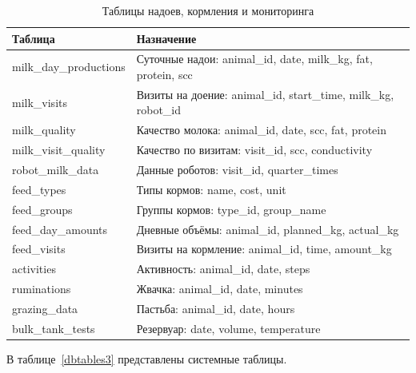 \begin{table}
  \caption{Таблицы надоев, кормления и мониторинга}
  \begin{tabular}{|l|p{8cm}|}
    \hline
    \textbf{Таблица} & \textbf{Назначение} \\
    \hline
    milk\_day\_productions & Суточные надои: animal\_id, date, milk\_kg, fat, protein, scc \\
    \hline
    milk\_visits & Визиты на доение: animal\_id, start\_time, milk\_kg, robot\_id \\
    \hline
    milk\_quality & Качество молока: animal\_id, date, scc, fat, protein \\
    \hline
    milk\_visit\_quality & Качество по визитам: visit\_id, scc, conductivity \\
    \hline
    robot\_milk\_data & Данные роботов: visit\_id, quarter\_times \\
    \hline
    feed\_types & Типы кормов: name, cost, unit \\
    \hline
    feed\_groups & Группы кормов: type\_id, group\_name \\
    \hline
    feed\_day\_amounts & Дневные объёмы: animal\_id, planned\_kg, actual\_kg \\
    \hline
    feed\_visits & Визиты на кормление: animal\_id, time, amount\_kg \\
    \hline
    activities & Активность: animal\_id, date, steps \\
    \hline
    ruminations & Жвачка: animal\_id, date, minutes \\
    \hline
    grazing\_data & Пастьба: animal\_id, date, hours \\
    \hline
    bulk\_tank\_tests & Резервуар: date, volume, temperature \\
    \hline
  \end{tabular}
  \label{dbtables2}
\end{table}

В таблице~\ref{dbtables3} представлены системные таблицы.

